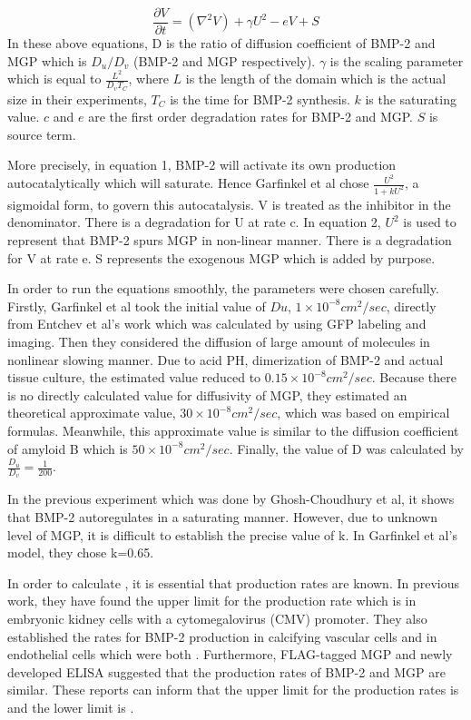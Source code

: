 \documentclass[12pt]{article}
\begin{document}
  \begin{equation}
  \frac{\partial V}{\partial t}=({\nabla}^2 V) + \gamma{U^2} - eV + S
  \label{eq:2}
  \end{equation}
  In these above equations, D is the ratio of diffusion coefficient of BMP-2 and MGP which is $D_u / D_v$ (BMP-2 and MGP respectively). $\gamma$ is the scaling parameter which is equal to $\frac{L^2}{D_v T_C}$, where $L$ is the length of the domain which is the actual size in their experiments, $T_C$ is the time for BMP-2 synthesis. $k$ is the saturating value. $c$ and $e$ are the first order degradation rates for BMP-2 and MGP. $S$ is source term.
  
  More precisely, in equation 1, BMP-2 will activate its own production autocatalytically which will saturate. Hence Garfinkel et al chose $\frac{U^2}{1+k U^2}$, a sigmoidal form, to govern this autocatalysis. V is treated as the inhibitor in the denominator. There is a degradation for U at rate c. In equation 2, $U^2$ is used to represent that BMP-2 spurs MGP in non-linear manner. There is a degradation for V at rate e. S represents the exogenous MGP which is added by purpose.
  
  In order to run the equations smoothly, the parameters were chosen carefully. Firstly, Garfinkel et al took the initial value of $Du$, $1 \times 10^{-8} cm^2/sec$, directly from Entchev et al’s work which was calculated by using GFP labeling and imaging. Then they considered the diffusion of large amount of molecules in nonlinear slowing manner. Due to acid PH, dimerization of BMP-2 and actual tissue culture, the estimated value reduced to $0.15 \times 10^{-8} cm^2/sec$. Because there is no directly calculated value for diffusivity of MGP, they estimated an theoretical approximate value, $30 \times 10^{-8} cm^2/sec$, which was based on empirical formulas. Meanwhile, this approximate value is similar to the diffusion coefficient of amyloid B which is $50 \times 10^{-8} cm^2/sec$. Finally, the value of D was calculated by $\frac{D_u}{D_v} = \frac{1}{200}$.
  
  In the previous experiment which was done by Ghosh-Choudhury et al, it shows that BMP-2 autoregulates in a saturating manner. However, due to unknown level of MGP, it is difficult to establish the precise value of k. In Garfinkel et al’s model, they chose k=0.65.
  
  In order to calculate , it is essential that production rates are known. In previous work, they have found the upper limit for the production rate which is in embryonic kidney cells with a cytomegalovirus (CMV) promoter. They also established the rates for BMP-2 production in calcifying vascular cells and in endothelial cells which were both . Furthermore, FLAG-tagged MGP and newly developed ELISA suggested that the production rates of BMP-2 and MGP are similar. These reports can inform that the upper limit for the production rates is  and the lower limit is .
  
\end{document}
